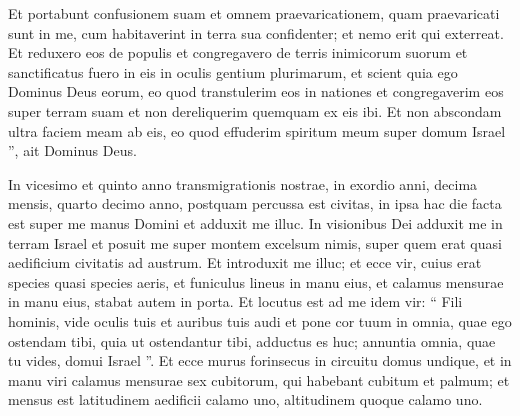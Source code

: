 \begin{biblechapter}
\begin{biblechapter}
\begin{biblechapter}
\begin{biblechapter}
\begin{biblechapter}
\begin{biblechapter}
\begin{biblechapter}
\begin{biblechapter}
\begin{biblechapter}
\begin{biblechapter}
\begin{biblechapter}
\begin{biblechapter}
\begin{biblechapter}
\begin{biblechapter}
\begin{biblechapter}
\begin{biblechapter}
\begin{biblechapter}
\begin{biblechapter}
\begin{biblechapter}
\begin{biblechapter}
\begin{biblechapter}
\begin{biblechapter}
\begin{biblechapter}
\begin{biblechapter}
\begin{biblechapter}
\begin{biblechapter}
\begin{biblechapter}
\begin{biblechapter}
\begin{biblechapter}
\begin{biblechapter}
\begin{biblechapter}
\begin{biblechapter}
\begin{biblechapter}
\begin{biblechapter}
\begin{biblechapter}
\begin{biblechapter}
\begin{biblechapter}
\begin{biblechapter}
\begin{biblechapter}
\verse Et portabunt confusionem suam et omnem praevaricationem, quam praevaricati sunt in me, cum habitaverint in terra sua confidenter; et nemo erit qui exterreat. 
\verse Et reduxero eos de populis et congregavero de terris inimicorum suorum et sanctificatus fuero in eis in oculis gentium plurimarum, 
\verse et scient quia ego Dominus Deus eorum, eo quod transtulerim eos in nationes et congregaverim eos super terram suam et non dereliquerim quemquam ex eis ibi. 
\verse Et non abscondam ultra faciem meam ab eis, eo quod effuderim spiritum meum super domum Israel ”, ait Dominus Deus.
 
\begin{biblechapter}
\verse In vicesimo et quinto anno transmigrationis nostrae, in exordio anni, decima mensis, quarto decimo anno, postquam percussa est civitas, in ipsa hac die facta est super me manus Domini et adduxit me illuc. 
\verse In visionibus Dei adduxit me in terram Israel et posuit me super montem excelsum nimis, super quem erat quasi aedificium civitatis ad austrum. 
\verse Et introduxit me illuc; et ecce vir, cuius erat species quasi species aeris, et funiculus lineus in manu eius, et calamus mensurae in manu eius, stabat autem in porta. 
\verse Et locutus est ad me idem vir: “ Fili hominis, vide oculis tuis et auribus tuis audi et pone cor tuum in omnia, quae ego ostendam tibi, quia ut ostendantur tibi, adductus es huc; annuntia omnia, quae tu vides, domui Israel ”.
 \verse Et ecce murus forinsecus in circuitu domus undique, et in manu viri calamus mensurae sex cubitorum, qui habebant cubitum et palmum; et mensus est latitudinem aedificii calamo uno, altitudinem quoque calamo uno.

\end{biblechapter}
\end{biblechapter}
\end{biblechapter}
\end{biblechapter}
\end{biblechapter}
\end{biblechapter}
\end{biblechapter}
\end{biblechapter}
\end{biblechapter}
\end{biblechapter}
\end{biblechapter}
\end{biblechapter}
\end{biblechapter}
\end{biblechapter}
\end{biblechapter}
\end{biblechapter}
\end{biblechapter}
\end{biblechapter}
\end{biblechapter}
\end{biblechapter}
\end{biblechapter}
\end{biblechapter}
\end{biblechapter}
\end{biblechapter}
\end{biblechapter}
\end{biblechapter}
\end{biblechapter}
\end{biblechapter}
\end{biblechapter}
\end{biblechapter}
\end{biblechapter}
\end{biblechapter}
\end{biblechapter}
\end{biblechapter}
\end{biblechapter}
\end{biblechapter}
\end{biblechapter}
\end{biblechapter}
\end{biblechapter}
\end{biblechapter}
